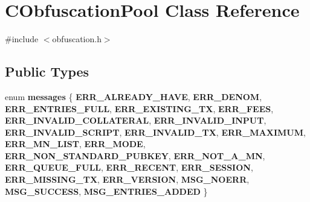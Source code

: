 \hypertarget{class_c_obfuscation_pool}{}\section{C\+Obfuscation\+Pool Class Reference}
\label{class_c_obfuscation_pool}


{\ttfamily \#include $<$obfuscation.\+h$>$}

\subsection*{Public Types}
\begin{DoxyCompactItemize}
\item 
\mbox{\label{class_c_obfuscation_pool_a9ae4a793e3b26ba61096fd27e962293a}} 
enum {\bfseries messages} \{ \newline
{\bfseries E\+R\+R\+\_\+\+A\+L\+R\+E\+A\+D\+Y\+\_\+\+H\+A\+VE}, 
{\bfseries E\+R\+R\+\_\+\+D\+E\+N\+OM}, 
{\bfseries E\+R\+R\+\_\+\+E\+N\+T\+R\+I\+E\+S\+\_\+\+F\+U\+LL}, 
{\bfseries E\+R\+R\+\_\+\+E\+X\+I\+S\+T\+I\+N\+G\+\_\+\+TX}, 
\newline
{\bfseries E\+R\+R\+\_\+\+F\+E\+ES}, 
{\bfseries E\+R\+R\+\_\+\+I\+N\+V\+A\+L\+I\+D\+\_\+\+C\+O\+L\+L\+A\+T\+E\+R\+AL}, 
{\bfseries E\+R\+R\+\_\+\+I\+N\+V\+A\+L\+I\+D\+\_\+\+I\+N\+P\+UT}, 
{\bfseries E\+R\+R\+\_\+\+I\+N\+V\+A\+L\+I\+D\+\_\+\+S\+C\+R\+I\+PT}, 
\newline
{\bfseries E\+R\+R\+\_\+\+I\+N\+V\+A\+L\+I\+D\+\_\+\+TX}, 
{\bfseries E\+R\+R\+\_\+\+M\+A\+X\+I\+M\+UM}, 
{\bfseries E\+R\+R\+\_\+\+M\+N\+\_\+\+L\+I\+ST}, 
{\bfseries E\+R\+R\+\_\+\+M\+O\+DE}, 
\newline
{\bfseries E\+R\+R\+\_\+\+N\+O\+N\+\_\+\+S\+T\+A\+N\+D\+A\+R\+D\+\_\+\+P\+U\+B\+K\+EY}, 
{\bfseries E\+R\+R\+\_\+\+N\+O\+T\+\_\+\+A\+\_\+\+MN}, 
{\bfseries E\+R\+R\+\_\+\+Q\+U\+E\+U\+E\+\_\+\+F\+U\+LL}, 
{\bfseries E\+R\+R\+\_\+\+R\+E\+C\+E\+NT}, 
\newline
{\bfseries E\+R\+R\+\_\+\+S\+E\+S\+S\+I\+ON}, 
{\bfseries E\+R\+R\+\_\+\+M\+I\+S\+S\+I\+N\+G\+\_\+\+TX}, 
{\bfseries E\+R\+R\+\_\+\+V\+E\+R\+S\+I\+ON}, 
{\bfseries M\+S\+G\+\_\+\+N\+O\+E\+RR}, 
\newline
{\bfseries M\+S\+G\+\_\+\+S\+U\+C\+C\+E\+SS}, 
{\bfseries M\+S\+G\+\_\+\+E\+N\+T\+R\+I\+E\+S\+\_\+\+A\+D\+D\+ED}
 \}
\end{DoxyCompactItemize}
